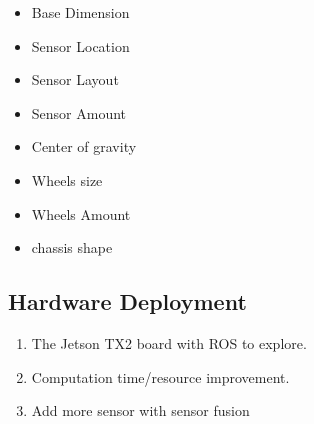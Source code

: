 \documentclass[10pt,journal,compsoc]{IEEEtran}
\begin{document}
\begin{itemize}
\item Base Dimension 
\item Sensor Location
\item Sensor Layout
\item Sensor Amount
\item Center of gravity
\item Wheels size
\item Wheels Amount
\item chassis shape
\end{itemize}

\subsection{Hardware Deployment}
\begin{enumerate}
\item The Jetson TX2 board with ROS to explore. 
\item Computation time/resource improvement.
\item Add more sensor with sensor fusion 
\end{enumerate}




\end{document}
